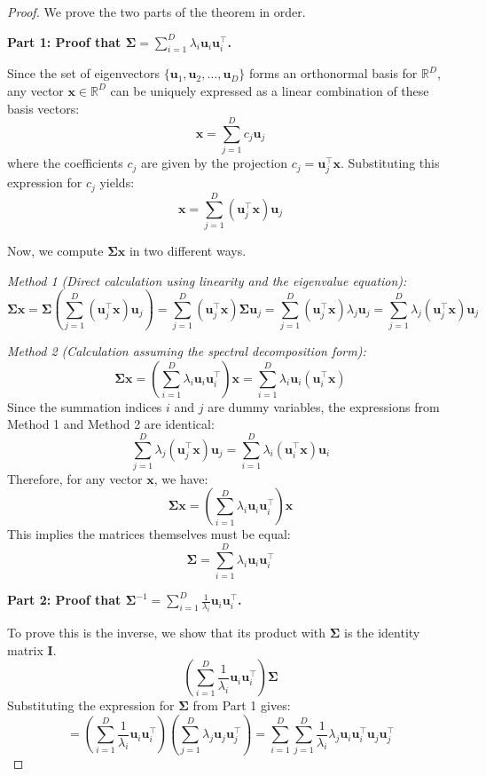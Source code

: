 \documentclass[../main.tex]{subfiles}
\begin{document}
\begin{proof}
We prove the two parts of the theorem in order.

\noindent\textbf{Part 1: Proof that $\boldsymbol{\Sigma} = \sum_{i=1}^{D} \lambda_i \mathbf{u}_i \mathbf{u}_i^\top$.}

Since the set of eigenvectors $\{\mathbf{u}_1, \mathbf{u}_2, \dots, \mathbf{u}_D\}$ forms an orthonormal basis for $\mathbb{R}^D$, any vector $\mathbf{x} \in \mathbb{R}^D$ can be uniquely expressed as a linear combination of these basis vectors:
$$
\mathbf{x} = \sum_{j=1}^{D} c_j \mathbf{u}_j
$$
where the coefficients $c_j$ are given by the projection $c_j = \mathbf{u}_j^\top \mathbf{x}$. Substituting this expression for $c_j$ yields:
$$
\mathbf{x} = \sum_{j=1}^{D} (\mathbf{u}_j^\top \mathbf{x}) \mathbf{u}_j
$$

Now, we compute $\boldsymbol{\Sigma} \mathbf{x}$ in two different ways.

\noindent\textit{Method 1 (Direct calculation using linearity and the eigenvalue equation):}
$$
\boldsymbol{\Sigma} \mathbf{x} = \boldsymbol{\Sigma} \left( \sum_{j=1}^{D} (\mathbf{u}_j^\top \mathbf{x}) \mathbf{u}_j \right) = \sum_{j=1}^{D} (\mathbf{u}_j^\top \mathbf{x}) \boldsymbol{\Sigma} \mathbf{u}_j = \sum_{j=1}^{D} (\mathbf{u}_j^\top \mathbf{x}) \lambda_j \mathbf{u}_j = \sum_{j=1}^{D} \lambda_j (\mathbf{u}_j^\top \mathbf{x}) \mathbf{u}_j
$$

\noindent\textit{Method 2 (Calculation assuming the spectral decomposition form):}
$$
\boldsymbol{\Sigma} \mathbf{x} = \left( \sum_{i=1}^{D} \lambda_i \mathbf{u}_i \mathbf{u}_i^\top \right) \mathbf{x} = \sum_{i=1}^{D} \lambda_i \mathbf{u}_i (\mathbf{u}_i^\top \mathbf{x})
$$
Since the summation indices $i$ and $j$ are dummy variables, the expressions from Method 1 and Method 2 are identical:
$$
\sum_{j=1}^{D} \lambda_j (\mathbf{u}_j^\top \mathbf{x}) \mathbf{u}_j = \sum_{i=1}^{D} \lambda_i (\mathbf{u}_i^\top \mathbf{x}) \mathbf{u}_i
$$
Therefore, for any vector $\mathbf{x}$, we have:
$$
\boldsymbol{\Sigma} \mathbf{x} = \left( \sum_{i=1}^{D} \lambda_i \mathbf{u}_i \mathbf{u}_i^\top \right) \mathbf{x}
$$
This implies the matrices themselves must be equal:
$$
\boldsymbol{\Sigma} = \sum_{i=1}^{D} \lambda_i \mathbf{u}_i \mathbf{u}_i^\top
$$

\noindent\textbf{Part 2: Proof that $\boldsymbol{\Sigma}^{-1} = \sum_{i=1}^{D} \frac{1}{\lambda_i} \mathbf{u}_i \mathbf{u}_i^\top$.}

To prove this is the inverse, we show that its product with $\boldsymbol{\Sigma}$ is the identity matrix $\mathbf{I}$.
$$
\left( \sum_{i=1}^{D} \frac{1}{\lambda_i} \mathbf{u}_i \mathbf{u}_i^\top \right) \boldsymbol{\Sigma}
$$
Substituting the expression for $\boldsymbol{\Sigma}$ from Part 1 gives:
$$
= \left( \sum_{i=1}^{D} \frac{1}{\lambda_i} \mathbf{u}_i \mathbf{u}_i^\top \right) \left( \sum_{j=1}^{D} \lambda_j \mathbf{u}_j \mathbf{u}_j^\top \right) = \sum_{i=1}^{D} \sum_{j=1}^{D} \frac{1}{\lambda_i} \lambda_j \mathbf{u}_i \mathbf{u}_i^\top \mathbf{u}_j \mathbf{u}_j^\top
$$


\end{proof}
\end{document}

